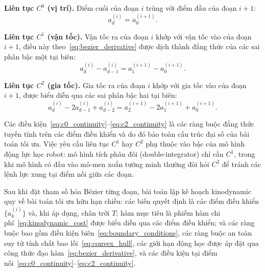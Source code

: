 \textbf{Liên tục $C^0$ (vị trí).}
Điểm cuối của đoạn $i$ trùng với điểm đầu của đoạn $i+1$:
\begin{equation}
    a^{(i)}_d = a^{(i+1)}_0.
    \label{eq:c0_continuity}
\end{equation}

\textbf{Liên tục $C^1$ (vận tốc).}
Vận tốc ra của đoạn $i$ khớp với vận tốc vào của đoạn $i+1$,
điều này theo~\eqref{eq:bezier_derivative} được dịch thành đẳng thức của các sai phân bậc
một tại biên:
\begin{equation}
    a^{(i)}_d - a^{(i)}_{d-1} = a^{(i+1)}_1 - a^{(i+1)}_0.
    \label{eq:c1_continuity}
\end{equation}

\textbf{Liên tục $C^2$ (gia tốc).}
Gia tốc ra của đoạn $i$ khớp với gia tốc vào của đoạn $i+1$,
được biểu diễn qua các sai phân bậc hai tại biên:
\begin{equation}
    a^{(i)}_d - 2a^{(i)}_{d-1} + a^{(i)}_{d-2}
    = a^{(i+1)}_2 - 2a^{(i+1)}_1 + a^{(i+1)}_0.
    \label{eq:c2_continuity}
\end{equation}

Các điều kiện~\eqref{eq:c0_continuity}--\eqref{eq:c2_continuity} là các ràng buộc đẳng thức
tuyến tính trên các điểm điều khiển và do đó bảo toàn cấu trúc đại số của bài toán tối ưu.
Việc yêu cầu liên tục $C^1$ hay $C^2$ phụ thuộc vào bậc của mô hình động lực học robot:
mô hình tích phân đôi (double-integrator) chỉ cần $C^1$, trong khi mô hình có đầu vào mô-men
xoắn tường minh thường đòi hỏi $C^2$ để tránh các lệnh lực xung tại điểm nối giữa các đoạn.

Sau khi đặt tham số hóa Bézier từng đoạn, bài toán lập kế hoạch kinodynamic quy về bài toán
tối ưu hữu hạn chiều: các biến quyết định là các điểm điều khiển $\{a^{(i)}_k\}$ và, khi áp
dụng, chân trời $T$; hàm mục tiêu là phiếm hàm chi phí~\eqref{eq:kinodynamic_cost} được biểu
diễn qua các điểm điều khiển; và các ràng buộc bao gồm điều kiện
biên~\eqref{eq:boundary_conditions}, các ràng buộc an toàn suy từ tính chất bao
lồi~\eqref{eq:convex_hull}, các giới hạn động học được áp đặt qua công thức đạo
hàm~\eqref{eq:bezier_derivative}, và các điều kiện tại điểm
nối~\eqref{eq:c0_continuity}--\eqref{eq:c2_continuity}.

